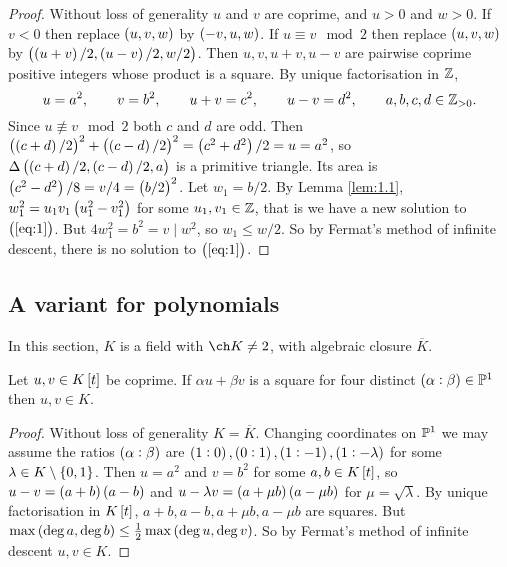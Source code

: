 \begin{proof}
Without loss of generality $ u $ and $ v $ are coprime, and $ u > 0 $ and $ w > 0 $. If $ v < 0 $ then replace $ \br{u, v, w} $ by $ \br{-v, u, w} $. If $ u \equiv v \mod 2 $ then replace $ \br{u, v, w} $ by $ \br{\br{u + v} / 2, \br{u - v} / 2, w / 2} $. Then $ u, v, u + v, u - v $ are pairwise coprime positive integers whose product is a square. By unique factorisation in $ \mathbb{Z} $,
$$ u = a^2, \qquad v = b^2, \qquad u + v = c^2, \qquad u - v = d^2, \qquad a, b, c, d \in \mathbb{Z}_{> 0}. $$
Since $ u \not\equiv v \mod 2 $ both $ c $ and $ d $ are odd. Then $ \br{\br{c + d} / 2}^2 + \br{\br{c - d} / 2}^2 = \br{c^2 + d^2} / 2 = u = a^2 $, so $ \Delta\br{\br{c + d} / 2, \br{c - d} / 2, a} $ is a primitive triangle. Its area is $ \br{c^2 - d^2} / 8 = v / 4 = \br{b / 2}^2 $. Let $ w_1 = b / 2 $. By Lemma \ref{lem:1.1}, $ w_1^2 = u_1v_1\br{u_1^2 - v_1^2} $ for some $ u_1, v_1 \in \mathbb{Z} $, that is we have a new solution to $ \br{\ref{eq:1}} $. But $ 4w_1^2 = b^2 = v \mid w^2 $, so $ w_1 \le w / 2 $. So by Fermat's method of infinite descent, there is no solution to $ \br{\ref{eq:1}} $.
\end{proof}

\subsection{A variant for polynomials}

In this section, $ K $ is a field with $ \ch K \ne 2 $, with algebraic closure $ \overline{K} $.

\begin{lemma}
\label{lem:1.4}
Let $ u, v \in K\sbr{t} $ be coprime. If $ \alpha u + \beta v $ is a square for four distinct $ \br{\alpha : \beta} \in \PP^1 $ then $ u, v \in K $.
\end{lemma}

\begin{proof}
Without loss of generality $ K = \overline{K} $. Changing coordinates on $ \mathbb{P}^1 $ we may assume the ratios $ \br{\alpha : \beta} $ are $ \br{1 : 0}, \br{0 : 1}, \br{1 : -1}, \br{1 : -\lambda} $ for some $ \lambda \in K \setminus \cbr{0, 1} $. Then $ u = a^2 $ and $ v = b^2 $ for some $ a, b \in K\sbr{t} $, so $ u - v = \br{a + b}\br{a - b} $ and $ u - \lambda v = \br{a + \mu b}\br{a - \mu b} $ for $ \mu = \sqrt{\lambda} $. By unique factorisation in $ K\sbr{t} $, $ a + b, a - b, a + \mu b, a - \mu b $ are squares. But $ \max\br{\deg a, \deg b} \le \tfrac{1}{2}\max\br{\deg u, \deg v} $. So by Fermat's method of infinite descent $ u, v \in K $.
\end{proof}

